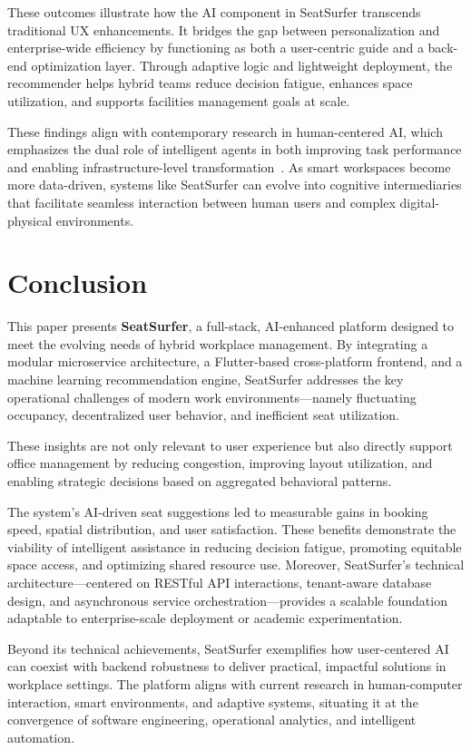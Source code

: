 \documentclass[onecolumn, 12pt]{IEEEtran}
\begin{document}
These outcomes illustrate how the AI component in SeatSurfer transcends traditional UX enhancements. It bridges the gap between personalization and enterprise-wide efficiency by functioning as both a user-centric guide and a back-end optimization layer. Through adaptive logic and lightweight deployment, the recommender helps hybrid teams reduce decision fatigue, enhances space utilization, and supports facilities management goals at scale.

These findings align with contemporary research in human-centered AI, which emphasizes the dual role of intelligent agents in both improving task performance and enabling infrastructure-level transformation~\cite{brown2022usertracking,zhang2022envaware}. As smart workspaces become more data-driven, systems like SeatSurfer can evolve into cognitive intermediaries that facilitate seamless interaction between human users and complex digital-physical environments.

\section{Conclusion}

This paper presents \textbf{SeatSurfer}, a full-stack, AI-enhanced platform designed to meet the evolving needs of hybrid workplace management. By integrating a modular microservice architecture, a Flutter-based cross-platform frontend, and a machine learning recommendation engine, SeatSurfer addresses the key operational challenges of modern work environments—namely fluctuating occupancy, decentralized user behavior, and inefficient seat utilization.

These insights are not only relevant to user experience but also directly support office management by reducing congestion, improving layout utilization, and enabling strategic decisions based on aggregated behavioral patterns.

The system's AI-driven seat suggestions led to measurable gains in booking speed, spatial distribution, and user satisfaction. These benefits demonstrate the viability of intelligent assistance in reducing decision fatigue, promoting equitable space access, and optimizing shared resource use. Moreover, SeatSurfer's technical architecture—centered on RESTful API interactions, tenant-aware database design, and asynchronous service orchestration—provides a scalable foundation adaptable to enterprise-scale deployment or academic experimentation.

Beyond its technical achievements, SeatSurfer exemplifies how user-centered AI can coexist with backend robustness to deliver practical, impactful solutions in workplace settings. The platform aligns with current research in human-computer interaction, smart environments, and adaptive systems, situating it at the convergence of software engineering, operational analytics, and intelligent automation.
\end{document}
